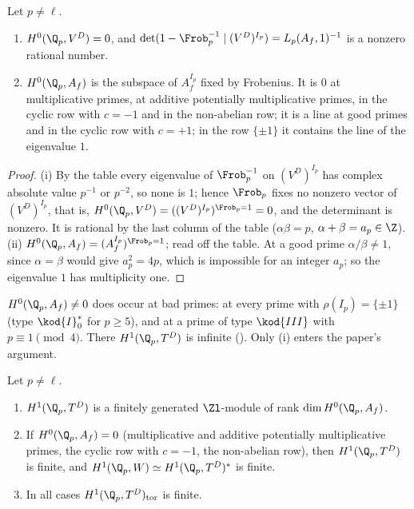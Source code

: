 \begin{lemma}\label{lem:blochkato:no-local-invariants}
Let $p\ne\ell$.
\begin{enumerate}[label=(\roman*)]
\item $H^0(\Q_p,V^D)=0$, and $\det(1-\Frob_p^{-1}\mid(V^D)^{I_p})=L_p(A_f,1)^{-1}$ is a nonzero rational number.
\item $H^0(\Q_p,A_f)$ is the subspace of $A_f^{I_p}$ fixed by Frobenius. It is $0$ at multiplicative primes, at additive potentially multiplicative primes, in
the cyclic row with $c=-1$ and in the non-abelian row; it is a line at good primes and in the cyclic row with $c=+1$; in the row $\{\pm1\}$ it contains the line
of the eigenvalue $1$.
\end{enumerate}
\end{lemma}

\begin{proof}
(i) By the table every eigenvalue of $\Frob_p^{-1}$ on $(V^D)^{I_p}$ has complex absolute value $p^{-1}$ or $p^{-2}$, so none is $1$; hence $\Frob_p$ fixes no nonzero
vector of $(V^D)^{I_p}$, that is, $H^0(\Q_p,V^D)=((V^D)^{I_p})^{\Frob_p=1}=0$, and the determinant is nonzero. It is rational by the last column of the table
($\alpha\beta=p$, $\alpha+\beta=a_p\in\Z$). (ii) $H^0(\Q_p,A_f)=(A_f^{I_p})^{\Frob_p=1}$; read off the table. At a good prime $\alpha/\beta\ne1$, since $\alpha=\beta$ would give $a_p^2=4p$,
which is impossible for an integer $a_p$; so the eigenvalue $1$ has multiplicity one.
\end{proof}

\begin{warning}\label{warn:blochkato:local-h0-af}
$H^0(\Q_p,A_f)\ne0$ does occur at bad primes: at every prime with $\rho(I_p)=\{\pm1\}$ (type $\kod{I}_0^*$ for $p\ge5$), and at a prime of type $\kod{III}$ with
$p\equiv1\pmod4$. There $H^1(\Q_p,T^D)$ is infinite (). Only (i) enters the paper's argument.
\end{warning}

\begin{corollary}\label{cor:blochkato:local-finiteness}
Let $p\ne\ell$.
\begin{enumerate}[label=(\roman*)]
\item $H^1(\Q_p,T^D)$ is a finitely generated $\Zl$-module of rank $\dim H^0(\Q_p,A_f)$.
\item If $H^0(\Q_p,A_f)=0$ (multiplicative and additive potentially multiplicative primes, the cyclic row with $c=-1$, the non-abelian row), then $H^1(\Q_p,T^D)$
is finite, and $H^1(\Q_p,W)\simeq H^1(\Q_p,T^D)^*$ is finite.
\item In all cases $H^1(\Q_p,T^D)_{\mathrm{tor}}$ is finite.
\end{enumerate}
\end{corollary}

